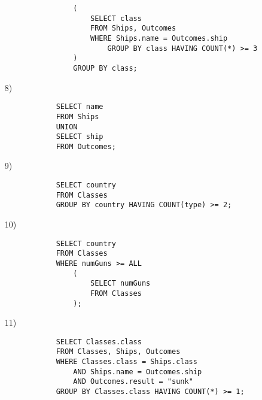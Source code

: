\documentclass[10pt,a4paper]{article}
\begin{document}
\begin{enumerate}
\begin{verbatim}
                (
                    SELECT class
                    FROM Ships, Outcomes
                    WHERE Ships.name = Outcomes.ship
                        GROUP BY class HAVING COUNT(*) >= 3
                )
                GROUP BY class;
        \end{verbatim}
        \item[8)]\begin{verbatim}
            SELECT name
            FROM Ships
            UNION
            SELECT ship
            FROM Outcomes;
        \end{verbatim}
        \item[9)]\begin{verbatim}
            SELECT country
            FROM Classes
            GROUP BY country HAVING COUNT(type) >= 2;
        \end{verbatim}
        \item[10)]\begin{verbatim}
            SELECT country
            FROM Classes
            WHERE numGuns >= ALL
                (
                    SELECT numGuns
                    FROM Classes
                );
        \end{verbatim}
        \item[11)]\begin{verbatim}
            SELECT Classes.class
            FROM Classes, Ships, Outcomes
            WHERE Classes.class = Ships.class
                AND Ships.name = Outcomes.ship
                AND Outcomes.result = "sunk"
            GROUP BY Classes.class HAVING COUNT(*) >= 1;
        \end{verbatim}
    \end{enumerate}
\end{document}
